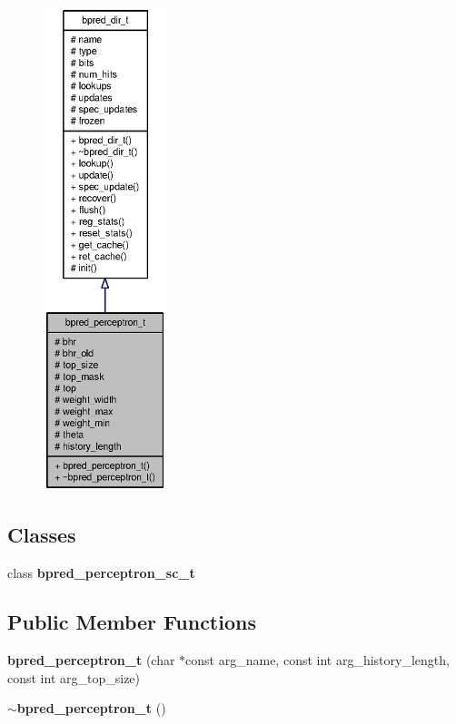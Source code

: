 \begin{figure}[H]
\begin{center}
\leavevmode
\includegraphics[height=400pt]{classbpred__perceptron__t__coll__graph}
\end{center}
\end{figure}
\subsection*{Classes}
\begin{CompactItemize}
\item 
class {\bf bpred\_\-perceptron\_\-sc\_\-t}
\end{CompactItemize}
\subsection*{Public Member Functions}
\begin{CompactItemize}
\item 
{\bf bpred\_\-perceptron\_\-t} (char $\ast$const arg\_\-name, const int arg\_\-history\_\-length, const int arg\_\-top\_\-size)
\item 
{\bf $\sim$bpred\_\-perceptron\_\-t} ()
\end{CompactItemize}
